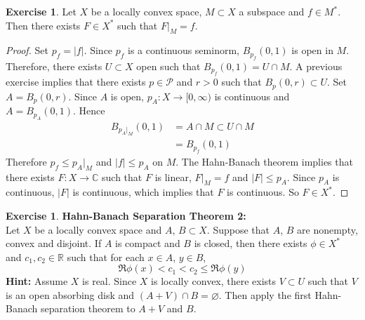 \documentclass[12pt]{amsart}
\theoremstyle{definition}
\newtheorem{ex}[definition]{Exercise}
\newcommand{\C}{\mathbb{C}}
\newcommand{\R}{\mathbb{R}}
\newcommand{\MP}{\mathcal{P}}
\newcommand{\Rg}{[0,\infty)}
\begin{document}
	\begin{ex}
		Let $X$ be a locally convex space, $M \subset X$ a subspace and $f \in M^*$. Then there exists $F \in X^*$ such that $F|_M = f$.  
	\end{ex}

	\begin{proof}
		Set $p_f = |f|$. Since $p_f$ is a continuous seminorm, $B_{p_f}(0,1)$ is open in $M$. Therefore, there exists $U \subset X$ open such that $B_{p_f}(0,1) = U \cap M$. A previous exercise implies that there exists $p \in \MP$ and $r >0$ such that $B_p(0, r) \subset U$. Set $A = B_p(0, r)$. Since $A$ is open, $p_A:X \rightarrow \Rg$ is continuous and $A = B_{p_A}(0,1)$. Hence 
		\begin{align*}
			B_{p_A|_M}(0,1) 
			&= A \cap M \subset U \cap M \\
			&= B_{p_f}(0,1) 
		\end{align*}  
		Therefore $p_f \leq p_A|_M$ and $|f| \leq p_A$ on $M$. The Hahn-Banach theorem implies that there exists $F:X \rightarrow \C$ such that $F$ is linear, $F|_M = f$ and $|F| \leq p_A$. Since $p_A$ is continuous, $|F|$ is continuous, which implies that $F$ is continuous. So $F \in X^*$.  
	\end{proof}
	
	\begin{ex} \textbf{Hahn-Banach Separation Theorem 2:}\\
		Let $X$ be a locally convex space and $A$, $B \subset X$. Suppose that $A$, $B$ are nonempty, convex and disjoint. If $A$ is compact and $B$ is closed, then there exists $\phi \in X^*$ and $c_1, c_2 \in \R$ such that for each $x \in A$, $y \in B$, $$\Re \phi(x) < c_1 < c_2 \leq \Re \phi(y)$$
		\textbf{Hint:} Assume $X$ is real. Since $X$ is locally convex, there exists $V \subset U$ such that $V$ is an open absorbing disk and $(A + V) \cap B = \varnothing$. Then apply the first Hahn-Banach separation theorem to $A+V$ and $B$.
	\end{ex}
	
\end{document}
